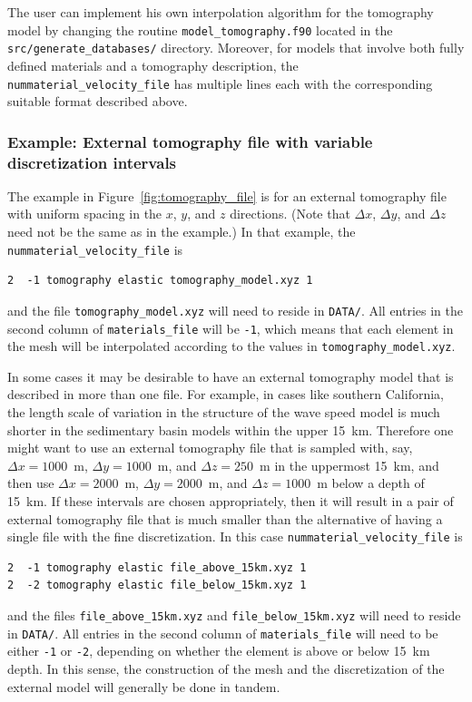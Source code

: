 The user can implement his own interpolation algorithm for the tomography
model by changing the routine \texttt{model\_tomography.f90} located
in the \texttt{src/generate\_databases/} directory. Moreover, for
models that involve both fully defined materials and a tomography
description, the \texttt{nummaterial\_velocity\_file} has multiple
lines each with the corresponding suitable format described above.


\subsubsection*{Example: External tomography file with variable discretization intervals}

The example in Figure~\ref{fig:tomography_file} is for an external tomography file with uniform spacing in the $x$, $y$, and $z$ directions. (Note that $\Delta x$, $\Delta y$, and $\Delta z$ need not be the same as in the example.) In that example, the  \texttt{nummaterial\_velocity\_file} is
%
\begin{verbatim}
2  -1 tomography elastic tomography_model.xyz 1
\end{verbatim}
%
and the file \texttt{tomography\_model.xyz} will need to reside in \texttt{DATA/}. All entries in the second column of \texttt{materials\_file} will be \texttt{-1}, which means that each element in the mesh will be interpolated according to the values in \texttt{tomography\_model.xyz}.

In some cases it may be desirable to have an external tomography model that is described in more than one file. For example, in cases like southern California, the length scale of variation in the structure of the wave speed model is much shorter in the sedimentary basin models within the upper 15~km. Therefore one might want to use an external tomography file that is sampled with, say, $\Delta x = 1000$~m, $\Delta y = 1000$~m, and $\Delta z = 250$~m in the uppermost 15~km, and then use $\Delta x = 2000$~m, $\Delta y = 2000$~m, and $\Delta z = 1000$~m below a depth of 15~km. If these intervals are chosen appropriately, then it will result in a pair of external tomography file that is much smaller than the alternative of having a single file with the fine discretization. In this case  \texttt{nummaterial\_velocity\_file} is
%
\begin{verbatim}
2  -1 tomography elastic file_above_15km.xyz 1
2  -2 tomography elastic file_below_15km.xyz 1
\end{verbatim}
%
and the files \texttt{file\_above\_15km.xyz} and \texttt{file\_below\_15km.xyz} will need to reside in \texttt{DATA/}.  All entries in the second column of \texttt{materials\_file} will need to be either \texttt{-1} or \texttt{-2}, depending on whether the element is above or below 15~km depth. In this sense, the construction of the mesh and the discretization of the external model will generally be done in tandem.

